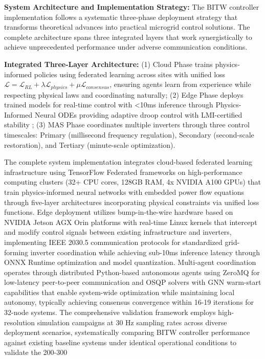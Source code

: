 \documentclass[12pt]{article}
\begin{document}
\textbf{System Architecture and Implementation Strategy:} The BITW controller implementation follows a systematic three-phase deployment strategy that transforms theoretical advances into practical microgrid control solutions. The complete architecture spans three integrated layers that work synergistically to achieve unprecedented performance under adverse communication conditions.

\textbf{Integrated Three-Layer Architecture:} (1) Cloud Phase trains physics-informed policies using federated learning across sites with unified loss $\mathcal{L} = \mathcal{L}_{RL} + \lambda \mathcal{L}_{physics} + \mu \mathcal{L}_{consensus}$, ensuring agents learn from experience while respecting physical laws and coordinating naturally; (2) Edge Phase deploys trained models for real-time control with <10ms inference through Physics-Informed Neural ODEs providing adaptive droop control with LMI-certified stability \cite{our2024theoretical}; (3) MAS Phase coordinates multiple inverters through three control timescales: Primary (millisecond frequency regulation), Secondary (second-scale restoration), and Tertiary (minute-scale optimization).

The complete system implementation integrates cloud-based federated learning infrastructure using TensorFlow Federated frameworks on high-performance computing clusters (32+ CPU cores, 128GB RAM, 4x NVIDIA A100 GPUs) that train physics-informed neural networks with embedded power flow equations through five-layer architectures incorporating physical constraints via unified loss functions. Edge deployment utilizes bump-in-the-wire hardware based on NVIDIA Jetson AGX Orin platforms with real-time Linux kernels that intercept and modify control signals between existing infrastructure and inverters, implementing IEEE 2030.5 communication protocols for standardized grid-forming inverter coordination while achieving sub-10ms inference latency through ONNX Runtime optimization and model quantization. Multi-agent coordination operates through distributed Python-based autonomous agents using ZeroMQ for low-latency peer-to-peer communication and OSQP solvers with GNN warm-start capabilities that enable system-wide optimization while maintaining local autonomy, typically achieving consensus convergence within 16-19 iterations for 32-node systems. The comprehensive validation framework employs high-resolution simulation campaigns at 30 Hz sampling rates across diverse deployment scenarios, systematically comparing BITW controller performance against existing baseline systems under identical operational conditions to validate the 200-300%
\end{document}
